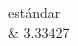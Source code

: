 \documentclass[10pt,a4paper]{article} %
\begin{document}
\begin{center}
\begin{tabular}
                                                                                                                                                                                                                                                                                                                                                                                                                                                                                                                                                                                                            est\'andar
                                                                                                                                                                                                                                                                                                                                                                                                                                                                                                                                                                                                            \\
                                                                                                                                                                                                                                                                                                                                                                                                                                                                                                                                                                                                            &
                                                                                                                                                                                                                                                                                                                                                                                                                                                                                                                                                                                                                        3.33427

\end{tabular}
\end{center}
\end{document}
